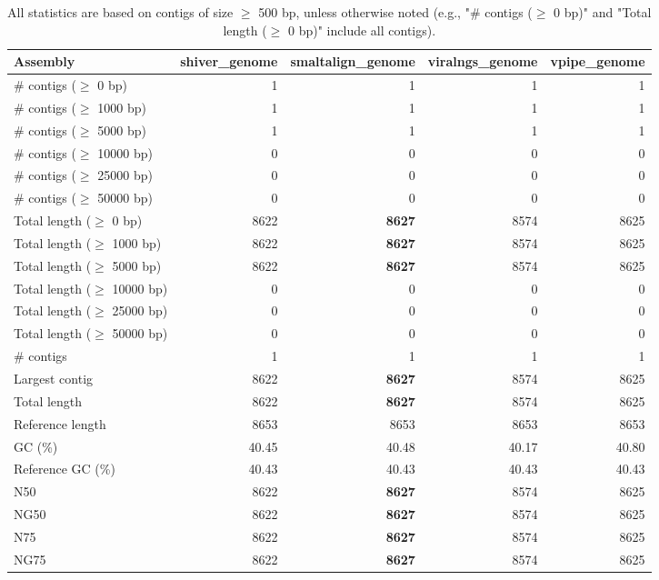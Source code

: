 \documentclass[12pt,a4paper]{article}
\begin{document}
\begin{table}[ht]
\begin{center}
\caption{All statistics are based on contigs of size $\geq$ 500 bp, unless otherwise noted (e.g., "\# contigs ($\geq$ 0 bp)" and "Total length ($\geq$ 0 bp)" include all contigs).}
\begin{tabular}{|l*{4}{|r}|}
\hline
Assembly & shiver\_genome & smaltalign\_genome & viralngs\_genome & vpipe\_genome \\ \hline
\# contigs ($\geq$ 0 bp) & 1 & 1 & 1 & 1 \\ \hline
\# contigs ($\geq$ 1000 bp) & 1 & 1 & 1 & 1 \\ \hline
\# contigs ($\geq$ 5000 bp) & 1 & 1 & 1 & 1 \\ \hline
\# contigs ($\geq$ 10000 bp) & 0 & 0 & 0 & 0 \\ \hline
\# contigs ($\geq$ 25000 bp) & 0 & 0 & 0 & 0 \\ \hline
\# contigs ($\geq$ 50000 bp) & 0 & 0 & 0 & 0 \\ \hline
Total length ($\geq$ 0 bp) & 8622 & {\bf 8627} & 8574 & 8625 \\ \hline
Total length ($\geq$ 1000 bp) & 8622 & {\bf 8627} & 8574 & 8625 \\ \hline
Total length ($\geq$ 5000 bp) & 8622 & {\bf 8627} & 8574 & 8625 \\ \hline
Total length ($\geq$ 10000 bp) & 0 & 0 & 0 & 0 \\ \hline
Total length ($\geq$ 25000 bp) & 0 & 0 & 0 & 0 \\ \hline
Total length ($\geq$ 50000 bp) & 0 & 0 & 0 & 0 \\ \hline
\# contigs & 1 & 1 & 1 & 1 \\ \hline
Largest contig & 8622 & {\bf 8627} & 8574 & 8625 \\ \hline
Total length & 8622 & {\bf 8627} & 8574 & 8625 \\ \hline
Reference length & 8653 & 8653 & 8653 & 8653 \\ \hline
GC (\%) & 40.45 & 40.48 & 40.17 & 40.80 \\ \hline
Reference GC (\%) & 40.43 & 40.43 & 40.43 & 40.43 \\ \hline
N50 & 8622 & {\bf 8627} & 8574 & 8625 \\ \hline
NG50 & 8622 & {\bf 8627} & 8574 & 8625 \\ \hline
N75 & 8622 & {\bf 8627} & 8574 & 8625 \\ \hline
NG75 & 8622 & {\bf 8627} & 8574 & 8625 \\ \hline

\end{tabular}
\end{center}
\end{table}
\end{document}
